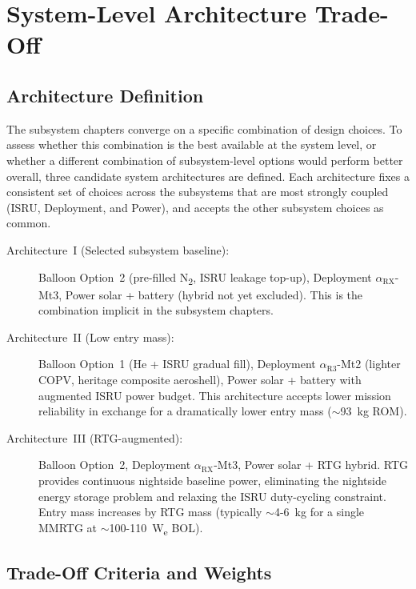 \section{System-Level Architecture Trade-Off}
\label{sec:arch_tradeoff}

\subsection{Architecture Definition}
\label{subsec:arch_definition}

The subsystem chapters converge on a specific combination of design choices. To assess whether this combination is the best available at the system level, or whether a different combination of subsystem-level options would perform better overall, three candidate system architectures are defined. Each architecture fixes a consistent set of choices across the subsystems that are most strongly coupled (ISRU, Deployment, and Power), and accepts the other subsystem choices as common.

\begin{description}
    \item[Architecture~I (Selected subsystem baseline):] Balloon Option~2 (pre-filled N\textsubscript{2}, ISRU leakage top-up), Deployment $\alpha_{\mathrm{RX}}$-Mt3, Power solar + battery (hybrid not yet excluded). This is the combination implicit in the subsystem chapters.

    \item[Architecture~II (Low entry mass):] Balloon Option~1 (He + ISRU gradual fill), Deployment $\alpha_{\mathrm{R3}}$-Mt2 (lighter COPV, heritage composite aeroshell), Power solar + battery with augmented ISRU power budget. This architecture accepts lower mission reliability in exchange for a dramatically lower entry mass ($\sim$93~kg ROM).

    \item[Architecture~III (RTG-augmented):] Balloon Option~2, Deployment $\alpha_{\mathrm{RX}}$-Mt3, Power solar + RTG hybrid. RTG provides continuous nightside baseline power, eliminating the nightside energy storage problem and relaxing the ISRU duty-cycling constraint. Entry mass increases by RTG mass (typically $\sim$4-6~kg for a single MMRTG at $\sim$100-110~W\textsubscript{e} BOL).
\end{description}

\subsection{Trade-Off Criteria and Weights}
\label{subsec:arch_criteria}

